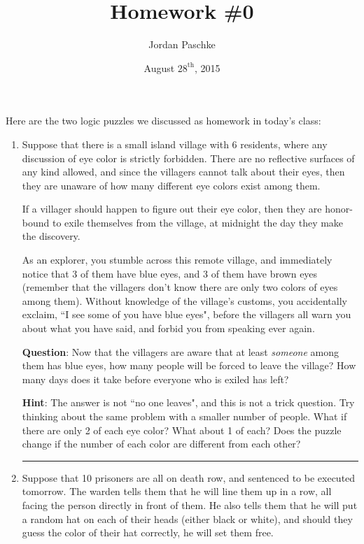 \documentclass[12pt]{article}
\title{Homework \#0}
\author{Jordan Paschke}
\date{August $28^{\text{th}}$, 2015}
\numberwithin{equation}{subsection}
\begin{document}
\maketitle

Here are the two logic puzzles we discussed as homework in today's class:

\begin{enumerate}
    \item Suppose that there is a small island village with 6 residents, where any discussion of eye color is strictly forbidden. There are no reflective surfaces of any kind allowed, and since the villagers cannot talk about their eyes, then they are unaware of how many different eye colors exist among them.

If a villager should happen to figure out their eye color, then they are honor-bound to exile themselves from the village, at midnight the day they make the discovery.

As an explorer, you stumble across this remote village, and immediately notice that 3 of them have blue eyes, and 3 of them have brown eyes (remember that the villagers don't know there are only two colors of eyes among them). Without knowledge of the village's customs, you accidentally exclaim, ``I see some of you have blue eyes", before the villagers all warn you about what you have said, and forbid you from speaking ever again.

\textbf{Question}: Now that the villagers are aware that at least \emph{someone} among them has blue eyes, how many people will be forced to leave the village? How many days does it take before everyone who is exiled has left?

\textbf{Hint}: The answer is not ``no one leaves", and this is not a trick question. Try thinking about the same problem with a smaller number of people. What if there are only 2 of each eye color? What about 1 of each? Does the puzzle change if the number of each color are different from each other?

\noindent\rule{15cm}{0.4pt}

    \item Suppose that 10 prisoners are all on death row, and sentenced to be executed tomorrow. The warden tells them that he will line them up in a row, all facing the person directly in front of them. He also tells them that he will put a random hat on each of their heads (either black or white), and should they guess the color of their hat correctly, he will set them free.


\end{enumerate}
\end{document}
